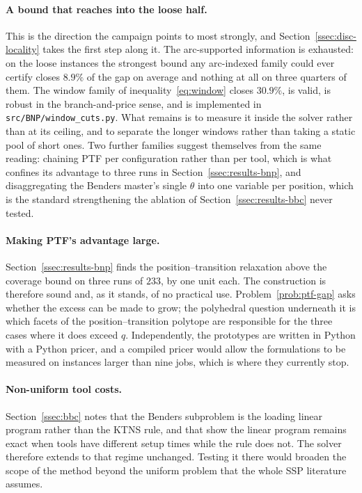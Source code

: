 \paragraph{A bound that reaches into the loose half.}
This is the direction the campaign points to most strongly, and
Section~\ref{ssec:disc-locality} takes the first step along it. The arc-supported
information is exhausted: on the loose instances the strongest bound any arc-indexed
family could ever certify closes $8.9\%$ of the gap on average and nothing at all on
three quarters of them. The window family of inequality~\eqref{eq:window} closes
$30.9\%$, is valid, is robust in the branch-and-price sense, and is implemented in
\texttt{src/BNP/window\_cuts.py}. What remains is to measure it inside the solver
rather than at its ceiling, and to separate the longer windows rather than taking a
static pool of short ones. Two further families suggest themselves from the same
reading: chaining PTF per configuration rather than per tool, which is what confines
its advantage to three runs in Section~\ref{ssec:results-bnp}, and disaggregating the
Benders master's single $\theta$ into one variable per position, which is the standard
strengthening the ablation of Section~\ref{ssec:results-bbc} never tested.

\paragraph{Making PTF's advantage large.}
Section~\ref{ssec:results-bnp} finds the position--transition relaxation above the
coverage bound on three runs of $233$, by one unit each. The construction is therefore
sound and, as it stands, of no practical use. Problem~\ref{prob:ptf-gap} asks whether
the excess can be made to grow; the polyhedral question underneath it is which facets
of the position--transition polytope are responsible for the three cases where it does
exceed $q$. Independently, the prototypes are written in Python with a Python pricer,
and a compiled pricer would allow the formulations to be measured on instances larger
than nine jobs, which is where they currently stop.

\paragraph{Non-uniform tool costs.}
Section~\ref{ssec:bbc} notes that the Benders subproblem is the loading linear program
rather than the KTNS rule, and that \citet{Crama1994} show the linear program remains
exact when tools have different setup times while the rule does not. The solver
therefore extends to that regime unchanged. Testing it there would broaden the scope of
the method beyond the uniform problem that the whole SSP literature assumes.

